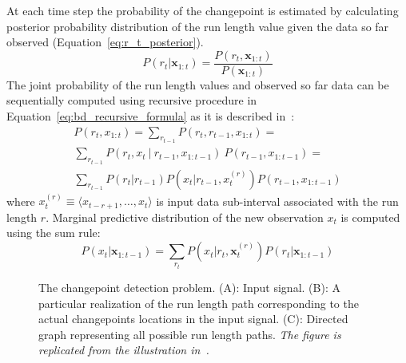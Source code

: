 At each time step the probability of the changepoint is estimated by calculating posterior probability distribution of the run length value given the data so far observed (Equation~\ref{eq:r_t_posterior}).
\begin{equation}
    P(r_t | \pmb{x}_{1:t}) = \frac{P(r_t, \pmb{x}_{1:t})}{P(\pmb{x}_{1:t})}
    \label{eq:r_t_posterior}
\end{equation}
The joint probability of the run length values and observed so far data
can be sequentially computed using recursive procedure in Equation~\ref{eq:bd_recursive_formula} as it is described in~\cite{mackay2007}:
\begin{multline}
    P(r_t, x_{1:t}) = \sum_{r_{t-1}} P(r_t, r_{t-1}, x_{1:t}) = \\
    \sum_{r_{t-1}} P(r_t, x_t \: | \: r_{t-1}, x_{1: t-1}) \: P(r_{t-1}, x_{1:t-1}) = \\
    \sum_{r_{t-1}} P(r_t | r_{t-1}) P(x_t | r_{t-1}, x_t^{(r)}) P(r_{t-1}, x_{1:t-1})
    \label{eq:bd_recursive_formula}
\end{multline}
where $x_t^{(r)} \equiv \langle x_{t-r+1},\dots,x_t \rangle$ is input data sub-interval associated with the run length $r$.
%
Marginal predictive distribution of the new observation $x_t$ is computed using the sum rule:
\begin{equation}
    P(x_{t} | \pmb{x}_{1:t-1}) = \sum_{r_t} P(x_{t}|r_{t}, \pmb{x}_t^{(r)}) P(r_t | \pmb{x}_{1:t-1})
    \label{eq:bd_marginal_predictive}
\end{equation}
%
\begin{figure}[htb!]
    
    \caption{
        The changepoint detection problem.
        (A): Input signal.
        (B): A particular realization of the run length path corresponding to the actual changepoints locations in the input signal.
        (C): Directed graph representing all possible run length paths.
        \textit{The figure is replicated from the illustration in~\cite{mackay2007}.}
        }
\label{fig:trellis_struct}
\end{figure}
